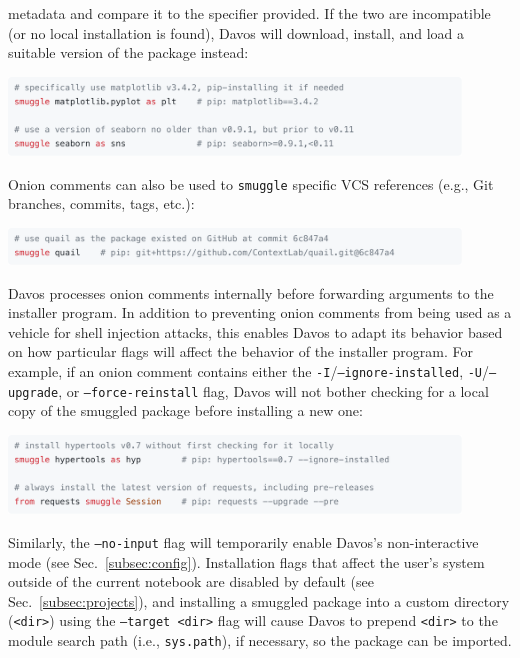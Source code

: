 \documentclass[preprint,12pt,a4paper]{elsarticle}
\begin{document}
metadata and compare it to the specifier provided. If the two are incompatible
(or no local installation is found), Davos will download, install, and load a
suitable version of the package instead: \begin{center}
\includegraphics[width=0.9\textwidth]{figs/snippet3} \end{center} Onion
comments can also be used to \texttt{smuggle} specific VCS references (e.g.,
Git~\cite{TorvHama05} branches, commits, tags, etc.): \begin{center}
\includegraphics[width=0.9\textwidth]{figs/snippet4} \end{center} Davos
processes onion comments internally before forwarding arguments to the
installer program. In addition to preventing onion comments from being used as
a vehicle for shell injection attacks, this enables Davos to adapt its behavior
based on how particular flags will affect the behavior of the installer
program. For example, if an onion comment contains either the
\texttt{-I}/\texttt{--ignore-installed}, \texttt{-U}/\texttt{--upgrade}, or
\texttt{--force-reinstall} flag, Davos will not bother checking for a local
copy of the smuggled package before installing a new one: \begin{center}
\includegraphics[width=0.9\textwidth]{figs/snippet5} \end{center} Similarly,
the \texttt{--no-input} flag will temporarily enable Davos's non-interactive
mode (see Sec.~\ref{subsec:config}). Installation flags that affect the user's
system outside of the current notebook are disabled by default (see
Sec.~\ref{subsec:projects}), and installing a smuggled package into a custom
directory (\texttt{<dir>}) using the \texttt{--target <dir>} flag will cause
Davos to prepend \texttt{<dir>} to the module search path (i.e.,
\texttt{sys.path}), if necessary, so the package can be imported.
\end{document}
